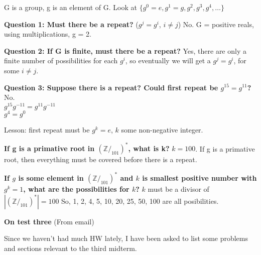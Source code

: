 G is a group, g is an element of G. Look at $\{g^0 = e, g^1 = g,g^2, g^3, g^4, \ldots\}$

\textbf{Question 1: Must there be a repeat?} ($g^j=g^i$, $i \neq j$) No. G = positive reals, using multiplications, g = 2.

\textbf{Question 2: If G is finite, must there be a repeat?} Yes, there are only a finite number of possibilities for each $g^i$, so eventually we will get a $g^j=g^i$, for some $i \neq j$.

\textbf{Question 3: Suppose there is a repeat? Could first repeat be $g^{15} = g^{11}$?} No. \\
$g^{15}g^{-11} = g^{11}g^{-11}$\\
$g^4 = g^0$

Lesson: first repeat must be $g^k = e$, $k$ some non-negative integer.

\textbf{If g is a primative root in $(\mathbb{Z}/_{101})^*$, what is k?} $k = 100$. If g is a primative root, then everything must be covered before there is a repeat.

\textbf{If $g$ is some element in $(\mathbb{Z}/_{101})^*$ and $k$ is smallest positive number with $g^k = 1$, what are the possibilities for $k$?} $k$ must be a divisor of $|(\mathbb{Z}/_{101})^*| = 100$ So, 1, 2, 4, 5, 10, 20, 25, 50, 100 are all posibilities.

\textbf{On test three} (From email)

Since we haven't had much HW lately, I have been asked to list some problems and sections relevant to the third midterm.

